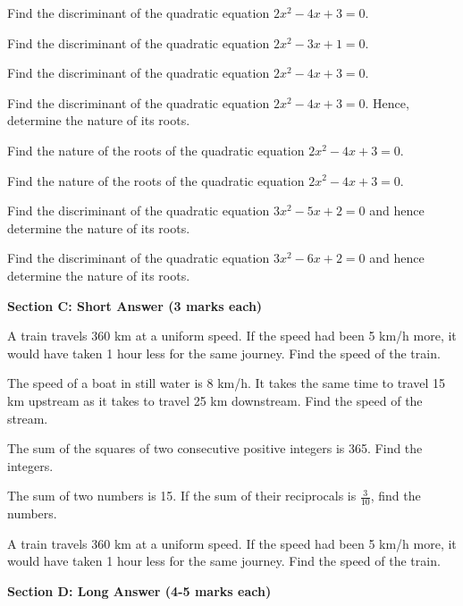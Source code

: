 \documentclass[12pt,a4paper]{exam}
\begin{document}
\begin{questions}
\question[1] Find the discriminant of the quadratic equation $2x^2 - 4x + 3 = 0$.
\vspace{0.15cm}

\question[1] Find the discriminant of the quadratic equation $2x^2 - 3x + 1 = 0$.
\vspace{0.15cm}

\question[1] Find the discriminant of the quadratic equation $2x^2 - 4x + 3 = 0$.
\vspace{0.15cm}

\question[2] Find the discriminant of the quadratic equation $2x^2 - 4x + 3 = 0$. Hence, determine the nature of its roots.
\vspace{0.15cm}

\question[2] Find the nature of the roots of the quadratic equation $2x^2 - 4x + 3 = 0$.
\vspace{0.15cm}

\question[2] Find the nature of the roots of the quadratic equation $2x^2 - 4x + 3 = 0$.
\vspace{0.15cm}

\question[2] Find the discriminant of the quadratic equation $3x^2 - 5x + 2 = 0$ and hence determine the nature of its roots.
\vspace{0.15cm}

\question[2] Find the discriminant of the quadratic equation $3x^2 - 6x + 2 = 0$ and hence determine the nature of its roots.
\vspace{0.15cm}

\end{questions}
\bigskip
\noindent\textbf{\large Section C: Short Answer (3 marks each)}

\begin{questions}
\question[3] A train travels 360 km at a uniform speed. If the speed had been 5 km/h more, it would have taken 1 hour less for the same journey. Find the speed of the train.
\vspace{0.15cm}

\question[3] The speed of a boat in still water is 8 km/h. It takes the same time to travel 15 km upstream as it takes to travel 25 km downstream. Find the speed of the stream.
\vspace{0.15cm}

\question[3] The sum of the squares of two consecutive positive integers is 365. Find the integers.
\vspace{0.15cm}

\question[3] The sum of two numbers is 15. If the sum of their reciprocals is $\frac{3}{10}$, find the numbers.
\vspace{0.15cm}

\question[3] A train travels 360 km at a uniform speed. If the speed had been 5 km/h more, it would have taken 1 hour less for the same journey. Find the speed of the train.
\vspace{0.15cm}

\end{questions}
\bigskip
\noindent\textbf{\large Section D: Long Answer (4-5 marks each)}
\end{document}
